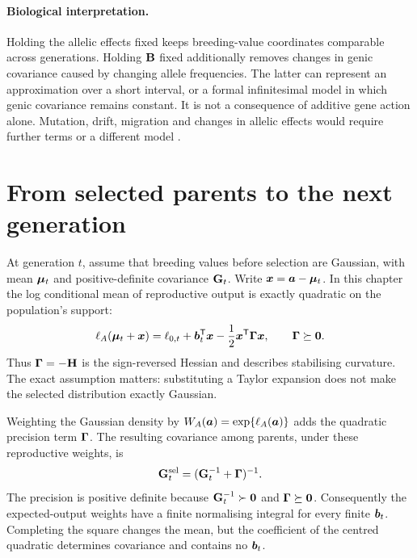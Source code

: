 \paragraph{Biological interpretation.}
Holding the allelic effects fixed keeps breeding-value coordinates
comparable across generations. Holding $\mathbf{B}$ fixed additionally removes
changes in genic covariance caused by changing allele frequencies. The
latter can represent an approximation over a short interval, or a formal
infinitesimal model in which genic covariance remains constant. It is not a
consequence of additive gene action alone. Mutation, drift, migration and
changes in allelic effects would require further terms or a different model
\citep{BartonTurelli1991,WalshLynch2018}.

\section{From selected parents to the next generation}
\label{inheritance:closure}

At generation $t$, assume that breeding values before selection are
Gaussian, with mean $\boldsymbol{\mu}_t$ and positive-definite covariance
$\mathbf{G}_t$. Write $\boldsymbol{x}=\boldsymbol{a}-\boldsymbol{\mu}_t$. In this chapter the
log conditional mean of reproductive output is exactly quadratic on the
population's support:
\begin{equation}
  \ell_A(\boldsymbol{\mu}_t+\boldsymbol{x})
     =\ell_{0,t}+\boldsymbol{b}_t^{\mathsf T}\boldsymbol{x}
                      -\frac12\boldsymbol{x}^{\mathsf T}\boldsymbol{\Gamma}\boldsymbol{x},
  \qquad \boldsymbol{\Gamma}\succeq\mathbf{0}.
  \label{inheritance:quadratic-fitness}
\end{equation}
Thus $\boldsymbol{\Gamma}=-\mathbf{H}$ is the sign-reversed Hessian and describes stabilising
curvature. The exact assumption matters: substituting a Taylor expansion
does not make the selected distribution exactly Gaussian.

Weighting the Gaussian density by
$W_A(\boldsymbol{a})=\exp\{\ell_A(\boldsymbol{a})\}$ adds the quadratic precision term
$\boldsymbol{\Gamma}$. The resulting covariance among parents, under these reproductive
weights, is
\begin{equation}
  \mathbf{G}_t^{\mathrm{sel}}
       =(\mathbf{G}_t^{-1}+\boldsymbol{\Gamma})^{-1}.
  \label{inheritance:selected-covariance}
\end{equation}
The precision is positive definite because $\mathbf{G}_t^{-1}\succ\mathbf{0}$ and
$\boldsymbol{\Gamma}\succeq\mathbf{0}$. Consequently the expected-output weights have a
finite normalising integral for every finite $\boldsymbol{b}_t$. Completing the
square changes the mean, but the coefficient of the centred quadratic
determines covariance and contains no $\boldsymbol{b}_t$.

